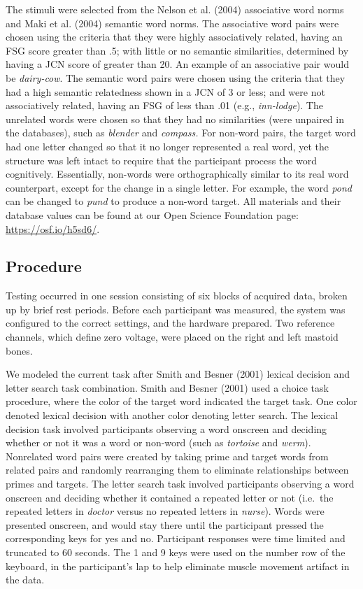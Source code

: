 \documentclass[english,man]{apa6}
\theoremstyle{definition}
\theoremstyle{definition}
\theoremstyle{definition}
\theoremstyle{remark}
\begin{document}
The stimuli were selected from the Nelson et al. (2004) associative word
norms and Maki et al. (2004) semantic word norms. The associative word
pairs were chosen using the criteria that they were highly associatively
related, having an FSG score greater than .5; with little or no semantic
similarities, determined by having a JCN score of greater than 20. An
example of an associative pair would be \emph{dairy-cow}. The semantic
word pairs were chosen using the criteria that they had a high semantic
relatedness shown in a JCN of 3 or less; and were not associatively
related, having an FSG of less than .01 (e.g., \emph{inn-lodge}). The
unrelated words were chosen so that they had no similarities (were
unpaired in the databases), such as \emph{blender} and \emph{compass.}
For non-word pairs, the target word had one letter changed so that it no
longer represented a real word, yet the structure was left intact to
require that the participant process the word cognitively. Essentially,
non-words were orthographically similar to its real word counterpart,
except for the change in a single letter. For example, the word
\emph{pond} can be changed to \emph{pund} to produce a non-word target.
All materials and their database values can be found at our Open Science
Foundation page: \url{https://osf.io/h5sd6/}.

\subsection{Procedure}\label{procedure}

Testing occurred in one session consisting of six blocks of acquired
data, broken up by brief rest periods. Before each participant was
measured, the system was configured to the correct settings, and the
hardware prepared. Two reference channels, which define zero voltage,
were placed on the right and left mastoid bones.

We modeled the current task after Smith and Besner (2001) lexical
decision and letter search task combination. Smith and Besner (2001)
used a choice task procedure, where the color of the target word
indicated the target task. One color denoted lexical decision with
another color denoting letter search. The lexical decision task involved
participants observing a word onscreen and deciding whether or not it
was a word or non-word (such as \emph{tortoise} and \emph{werm}).
Nonrelated word pairs were created by taking prime and target words from
related pairs and randomly rearranging them to eliminate relationships
between primes and targets. The letter search task involved participants
observing a word onscreen and deciding whether it contained a repeated
letter or not (i.e.~the repeated letters in \emph{doctor} versus no
repeated letters in \emph{nurse}). Words were presented onscreen, and
would stay there until the participant pressed the corresponding keys
for yes and no. Participant responses were time limited and truncated to
60 seconds. The 1 and 9 keys were used on the number row of the
keyboard, in the participant's lap to help eliminate muscle movement
artifact in the data.
\end{document}
